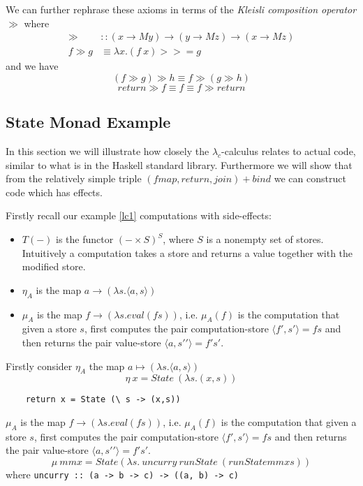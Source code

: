 We can further rephrase these axioms in terms
of the \textit{Kleisli composition operator} $\gg$ where
\begin{align}
    \gg &:: (x \rightarrow M y) \rightarrow (y \rightarrow M z) \rightarrow (x \rightarrow M z) \\
    f \gg g &\equiv \lambda x. (f\ x) >>= g
\end{align}
and we have
\begin{equation}
    (f \gg g) \gg h \equiv f \gg (g \gg h)
\end{equation}
\begin{equation}
    return \gg f \equiv f \equiv f \gg return
\end{equation}

\subsection{State Monad Example}
In this section we will illustrate how closely 
the $\lambda_c$-calculus relates to actual code,
similar to what is in the Haskell standard library.
Furthermore we will show that from the relatively
simple triple $(fmap,return,join) + bind$ we can
construct code which has effects.

Firstly recall our example \ref{lc1}
computations with side-effects:
\begin{itemize}
    \item $T(-)$ is the functor $(-\times S)^S$, where $S$ is a nonempty set of stores.
        Intuitively a computation takes a store and returns a value together with the modified store.
    \item $\eta_A$ is the map $a \rightarrow (\lambda s.\langle a,s \rangle)$
    \item $\mu_A$ is the map $f \rightarrow (\lambda s.eval(fs))$,
        i.e. $\mu_A(f)$ is the computation that given a store $s$,
        first computes the pair computation-store $\langle f\prime,s\prime\rangle = fs$
        and then returns the pair value-store $\langle a,s\prime\prime\rangle = f\prime s\prime$.
\end{itemize}

Firstly consider
$\eta_A$ the map $a \mapsto (\lambda s.\langle a,s \rangle)$
$$\eta\ x = State\ (\lambda s.(x,s))$$
\begin{verbatim}
    return x = State (\ s -> (x,s))
\end{verbatim}

$\mu_A$ is the map $f \rightarrow (\lambda s.eval(fs))$,
i.e. $\mu_A(f)$ is the computation that given a store $s$,
first computes the pair computation-store $\langle f\prime,s\prime\rangle = fs$
and then returns the pair value-store $\langle a,s\prime\prime\rangle = f\prime s\prime$.
$$\mu\ mmx = State (\lambda s.\ uncurry\ runState\ (runState mmx s))$$
where \texttt{uncurry :: (a -> b -> c) -> ((a, b) -> c)}


